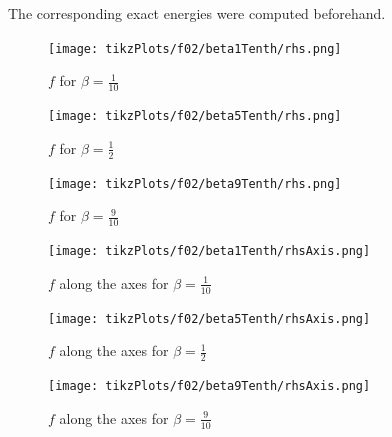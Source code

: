 \documentclass[draft=false,twoside,12pt]{scrreprt}
\begin{document}
The corresponding exact energies were computed beforehand.

\vspace{-\parskip}
\begin{minipage}[t]{0.3\textwidth}
  \begin{figure}[H]
	  \centering
		\texttt{[image: tikzPlots/f02/beta1Tenth/rhs.png]} 
    \caption{$f$ for $\beta=\frac{1}{10}$}
  \end{figure}
\end{minipage}
\hfill
\vline
\hfill
\begin{minipage}[t]{0.3\textwidth}
  \begin{figure}[H]
	  \centering
		\texttt{[image: tikzPlots/f02/beta5Tenth/rhs.png]} 
    \caption{$f$ for $\beta=\frac{1}{2}$}
  \end{figure}
\end{minipage}
\hfill
\vline
\hfill
\begin{minipage}[t]{0.3\textwidth}
  \begin{figure}[H]
	  \centering
		\texttt{[image: tikzPlots/f02/beta9Tenth/rhs.png]} 
    \caption{$f$ for $\beta=\frac{9}{10}$}
  \end{figure}
\end{minipage}

\vspace{-\parskip}
\begin{minipage}[t]{0.3\textwidth}
  \begin{figure}[H]
	  \centering
		\texttt{[image: tikzPlots/f02/beta1Tenth/rhsAxis.png]} 
    \caption{$f$ along the axes for $\beta=\frac{1}{10}$}
  \end{figure}
\end{minipage}
\hfill
\vline
\hfill
\begin{minipage}[t]{0.3\textwidth}
  \begin{figure}[H]
	  \centering
		\texttt{[image: tikzPlots/f02/beta5Tenth/rhsAxis.png]} 
    \caption{$f$ along the axes for $\beta=\frac{1}{2}$}
  \end{figure}
\end{minipage}
\hfill
\vline
\hfill
\begin{minipage}[t]{0.3\textwidth}
  \begin{figure}[H]
	  \centering
		\texttt{[image: tikzPlots/f02/beta9Tenth/rhsAxis.png]} 
    \caption{$f$ along the axes for $\beta=\frac{9}{10}$}
  \end{figure}
\end{minipage}
\end{document}
